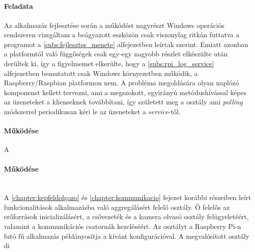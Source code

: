 \subsection{}
\paragraph{Feladata} Az alkalmazás fejlesztése során a működést nagyrészt Windows operációs rendszeren vizsgáltam a beágyazott eszközön csak viszonylag ritkán futtatva a programot a \ref{subs:fejlesztes_menete} alfejezetben leírtak szerint. Emiatt azonban a platformtól való függőségek csak egy-egy nagyobb részlet elkészülte után derültek ki, így a figyelmemet elkerülte, hogy a \ref{subs:rpi_log_service} alfejezetben bemutatott  csak Windows környezetben működik, a Raspberry/Raspbian platformon nem. A probléma megoldására olyan naplózó komponenst kellett tervezni, ami a megszokott, egyirányú metódushívással képes az üzeneteket a klienseknek továbbítani, így született meg a  osztály ami \emph{polling} módszerrel periodikusan kéri le az üzeneteket a \emph{service}-től.

\paragraph{Működése} A

\paragraph{Működése}

\subsection{}

\section{} \label{section:RpiRemoteHost}

A \ref{chapter:kepfeldolgozo} és \ref{chapter:kommunikacio} fejezet korábbi részeiben leírt funkcionalitások alkalmazásba való aggregálásért felelő osztály. Ő felelős az erőforrások inicializálásért, a csővezeték és a kamera olvasó osztály felügyeletéért, valamint a kommunikációs csatornák kezeléséért. Az osztályt a Raspberry Pi-n futó fű alkalmazás példányosítja a kívánt konfigurációval. A megvalósított osztály di

